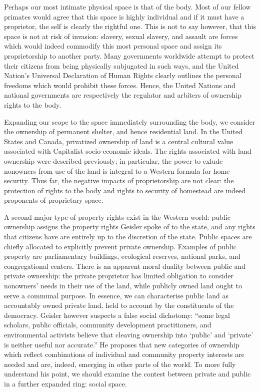 \documentclass[12pt, letterpaper, oneside]{article}
\begin{document}
Perhaps our most intimate physical space is that of the body. Most of our fellow primates would agree that this space is highly individual and if it must have a proprietor, the self is clearly the rightful one. This is not to say however, that this space is not at risk of invasion: slavery, sexual slavery, and assault are forces which would indeed commodify this most personal space and assign its proprietorship to another party. Many governments worldwide attempt to protect their citizens from being physically subjugated in such ways, and the United Nation's Universal Declaration of Human Rights clearly outlines the personal freedoms which would prohibit these forces. Hence, the United Nations and national governments are respectively the regulator and arbiters of ownership rights to the body.

Expanding our scope to the space immediately surrounding the body, we consider the ownership of permanent shelter, and hence residential land. In the United States and Canada, privatized ownership of land is a central cultural value associated with Capitalist socio-economic ideals. The rights associated with land ownership were described previously; in particular, the power to exlude nonowners from use of the land is integral to a Western formula for home security. Thus far, the negative impacts of proprietorship are not clear: the protection of rights to the body and rights to security of homestead are indeed proponents of proprietary space.

A second major type of property rights exist in the Western world: public ownership assigns the property rights Geisler spoke of to the state, and any rights that citizens have are entirely up to the discretion of the state. Public spaces are chiefly allocated to explicitly prevent private ownership. Examples of public property are parliamentary buildings, ecological reserves, national parks, and congregational centers. There is an apparent moral duality between public and private ownership: the private proprietor has limited obligation to consider nonowners' needs in their use of the land, while publicly owned land ought to serve a communal purpose. In essence, we can characterise public land as accountably owned private land, held to account by the constituents of the democracy. Geisler however suspects a false social dichotomy: ``some legal scholars, public officials, community development practitioners, and environmental activists believe that cleaving ownership into `public' and `private' is neither useful nor accurate.'' He proposes that new categories of ownership which reflect combinations of individual and community property interests are needed and are, indeed, emerging in other parts of the world. To more fully understand his point, we should examine the contest between private and public in a further expanded ring: social space.
\end{document}
